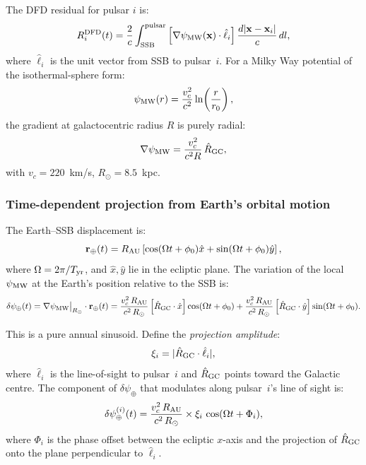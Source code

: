 \documentclass[aps,prd,twocolumn,superscriptaddress,nofootinbib]{revtex4-2}
\begin{document}
The DFD residual for pulsar $i$ is:
\begin{equation}
R_i^{\rm DFD}(t) = \frac{2}{c}\int_{\rm SSB}^{\rm pulsar}
\left[\nabla\psi_{\rm MW}(\mathbf{x})\cdot\hat{\ell}_i\right]
\frac{d|\mathbf{x} - \mathbf{x}_i|}{c}\,dl,
\label{eq:pta_integral_full}
\end{equation}
where $\hat{\ell}_i$ is the unit vector from SSB to pulsar~$i$.
For a Milky Way potential of the isothermal-sphere form:
\begin{equation}
\psi_{\rm MW}(r) = \frac{v_c^2}{c^2}\ln\!\left(\frac{r}{r_0}\right),
\end{equation}
the gradient at galactocentric radius $R$ is purely radial:
\begin{equation}
\nabla\psi_{\rm MW} = \frac{v_c^2}{c^2 R}\,\hat{R}_{\rm GC},
\label{eq:MW_gradient}
\end{equation}
with $v_c = 220$~km/s, $R_\odot = 8.5$~kpc.

\subsubsection{Time-dependent projection from Earth's orbital motion}

The Earth--SSB displacement is:
\begin{equation}
\mathbf{r}_\oplus(t) = R_{\rm AU}\left[\cos(\Omega t + \phi_0)\hat{x}
+ \sin(\Omega t + \phi_0)\hat{y}\right],
\end{equation}
where $\Omega = 2\pi/T_{\rm yr}$, and $\hat{x},\hat{y}$ lie in the ecliptic
plane. The variation of the local $\psi_{\rm MW}$ at the Earth's position
relative to the SSB is:
\begin{equation}
\delta\psi_\oplus(t) = \nabla\psi_{\rm MW}\big|_{R_\odot}
\cdot \mathbf{r}_\oplus(t)
= \frac{v_c^2\,R_{\rm AU}}{c^2\,R_\odot}
  \left[\hat{R}_{\rm GC}\cdot\hat{x}\right]\cos(\Omega t + \phi_0)
+ \frac{v_c^2\,R_{\rm AU}}{c^2\,R_\odot}
  \left[\hat{R}_{\rm GC}\cdot\hat{y}\right]\sin(\Omega t + \phi_0).
\label{eq:delta_psi_annual}
\end{equation}

This is a pure annual sinusoid. Define the \emph{projection amplitude}:
\begin{equation}
\xi_i = |\hat{R}_{\rm GC}\cdot\hat{\ell}_i|,
\label{eq:xi_proj}
\end{equation}
where $\hat{\ell}_i$ is the line-of-sight to pulsar~$i$ and
$\hat{R}_{\rm GC}$ points toward the Galactic centre.
The component of $\delta\psi_\oplus$ that modulates along pulsar~$i$'s
line of sight is:
\begin{equation}
\delta\psi_\oplus^{(i)}(t)
= \frac{v_c^2\,R_{\rm AU}}{c^2\,R_\odot}
  \times \xi_i\,\cos(\Omega t + \Phi_i),
\label{eq:delta_psi_i}
\end{equation}
where $\Phi_i$ is the phase offset between the ecliptic $x$-axis and
the projection of $\hat{R}_{\rm GC}$ onto the plane perpendicular to
$\hat{\ell}_i$.
\end{document}
